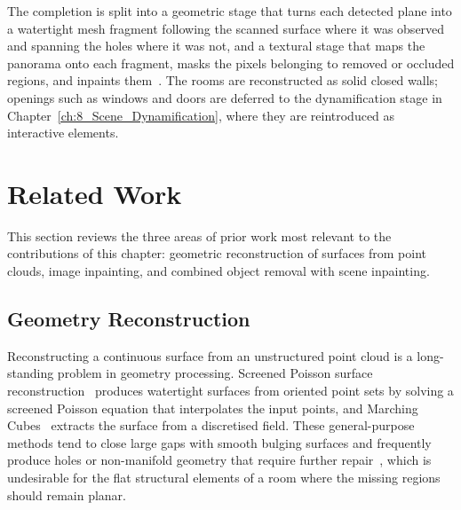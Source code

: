 The completion is split into a geometric stage that turns each detected plane into a watertight mesh fragment following the scanned surface where it was observed and spanning the holes where it was not, and a textural stage that maps the panorama onto each fragment, masks the pixels belonging to removed or occluded regions, and inpaints them~\cite{vermandere_semantic_2024, suvorov_resolution-robust_2022}. The rooms are reconstructed as solid closed walls; openings such as windows and doors are deferred to the dynamification stage in Chapter~\ref{ch:8_Scene_Dynamification}, where they are reintroduced as interactive elements.


\section{Related Work}
\label{sec:6_related}

This section reviews the three areas of prior work most relevant to the contributions of this chapter: geometric reconstruction of surfaces from point clouds, image inpainting, and combined object removal with scene inpainting.


\subsection{Geometry Reconstruction}
\label{sec:6_rw_geometry}

Reconstructing a continuous surface from an unstructured point cloud is a long-standing problem in geometry processing. Screened Poisson surface reconstruction~\cite{kazhdan_screened_2013} produces watertight surfaces from oriented point sets by solving a screened Poisson equation that interpolates the input points, and Marching Cubes~\cite{lorensen_marching_1998} extracts the surface from a discretised field. These general-purpose methods tend to close large gaps with smooth bulging surfaces and frequently produce holes or non-manifold geometry that require further repair~\cite{attene_lightweight_2010}, which is undesirable for the flat structural elements of a room where the missing regions should remain planar.

